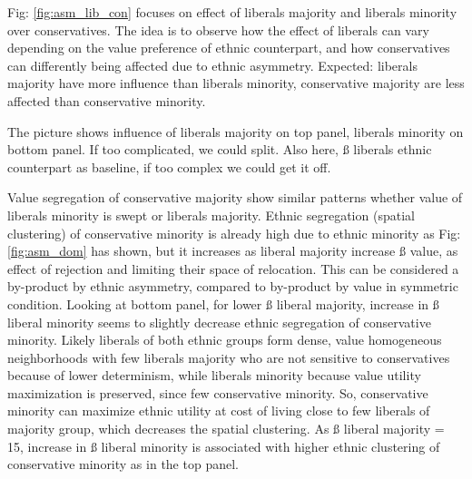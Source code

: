 \documentclass[
]{article}
\begin{document}
Fig: \ref{fig:asm_lib_con} focuses on effect of liberals majority and
liberals minority over conservatives. The idea is to observe how the
effect of liberals can vary depending on the value preference of ethnic
counterpart, and how conservatives can differently being affected due to
ethnic asymmetry. Expected: liberals majority have more influence than
liberals minority, conservative majority are less affected than
conservative minority.

The picture shows influence of liberals majority on top panel, liberals
minority on bottom panel. If too complicated, we could split. Also here,
ß liberals ethnic counterpart as baseline, if too complex we could get
it off.

Value segregation of conservative majority show similar patterns whether
value of liberals minority is swept or liberals majority. Ethnic
segregation (spatial clustering) of conservative minority is already
high due to ethnic minority as Fig: \ref{fig:asm_dom} has shown, but it
increases as liberal majority increase ß value, as effect of rejection
and limiting their space of relocation. This can be considered a
by-product by ethnic asymmetry, compared to by-product by value in
symmetric condition. Looking at bottom panel, for lower ß liberal
majority, increase in ß liberal minority seems to slightly decrease
ethnic segregation of conservative minority. Likely liberals of both
ethnic groups form dense, value homogeneous neighborhoods with few
liberals majority who are not sensitive to conservatives because of
lower determinism, while liberals minority because value utility
maximization is preserved, since few conservative minority. So,
conservative minority can maximize ethnic utility at cost of living
close to few liberals of majority group, which decreases the spatial
clustering. As ß liberal majority = 15, increase in ß liberal minority
is associated with higher ethnic clustering of conservative minority as
in the top panel.
\end{document}
